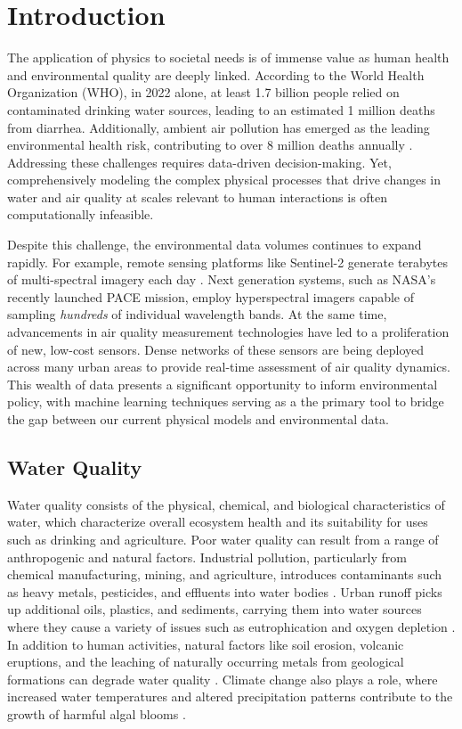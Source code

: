 \chapter{Introduction}\label{ch:intro}

The application of physics to societal needs is of immense value as human health and environmental quality are deeply linked. According to
the World Health Organization (WHO), in 2022 alone, at least 1.7 billion people
relied on contaminated drinking water sources, leading to an estimated 1 million
deaths from diarrhea. Additionally, ambient air pollution has emerged as the
leading environmental health risk, contributing to over 8 million deaths
annually \cite{air-pollution-mortality}. Addressing these challenges requires
data-driven decision-making. Yet, comprehensively modeling the complex physical
processes that drive changes in water and air quality at scales relevant to
human interactions is often computationally infeasible.

Despite this challenge, the environmental data volumes continues to expand
rapidly. For example, remote sensing platforms like Sentinel-2 generate
terabytes of multi-spectral imagery each day \cite{sentinel-2-data}. Next
generation systems, such as NASA’s recently launched PACE mission,
employ hyperspectral imagers capable of sampling \textit{hundreds} of individual
wavelength bands. At the same time, advancements in air quality measurement
technologies have led to a proliferation of new, low-cost sensors. Dense
networks of these sensors are being deployed across many urban areas to provide
real-time assessment of air quality dynamics. This wealth of data presents a
significant opportunity to inform environmental policy, with machine learning
techniques serving as a the primary tool to bridge the gap between our current
physical models and environmental data.




\section{Water Quality}

Water quality consists of the physical, chemical, and biological characteristics
of water, which characterize overall ecosystem health and its suitability for
uses such as drinking and agriculture. Poor water quality can result from a
range of anthropogenic and natural factors. Industrial pollution, particularly
from chemical manufacturing, mining, and agriculture, introduces
contaminants such as heavy metals, pesticides, and effluents into water
bodies \cite{schwarzenbach-water-pollution}. Urban runoff
picks up additional oils, plastics, and sediments, carrying them into
water sources where they cause a variety of issues such as
eutrophication and oxygen depletion \cite{smith-eutrophication}.
In addition to human activities, natural factors like soil erosion, volcanic
eruptions, and the leaching of naturally occurring metals from geological
formations can degrade water quality \cite{water-quality-natural}. Climate
change also plays a role, where increased water temperatures and altered
precipitation patterns contribute to the growth of harmful algal blooms
\cite{climate-change-water-quality}.

